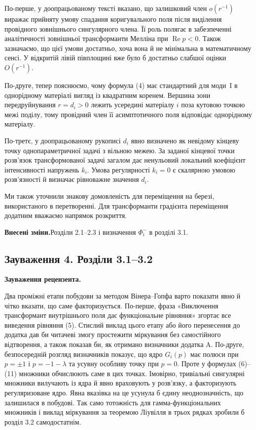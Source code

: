 \documentclass[11pt]{article}
\newcommand{\revisionheading}{\textbf{Внесені зміни.}\enspace}
\newenvironment{reviewcomment}{\def\FrameCommand{\textcolor{blue!45!black}{\vrule width 1.2pt}\hspace{9pt}}\MakeFramed{\advance\hsize-\width\FrameRestore}\noindent\textbf{Зауваження рецензента.}\par\smallskip\noindent}{\endMakeFramed}
\begin{document}
По-перше, у доопрацьованому тексті вказано, що залишковий член \(o(r^{-1})\) виражає прийняту умову спадання коригувального поля після виділення провідного зовнішнього сингулярного члена. Її роль полягає в забезпеченні аналітичності зовнішньої трансформанти Мелліна при \(\operatorname{Re}p<0\). Також зазначаємо, що цієї умови достатньо, хоча вона й не мінімальна в математичному сенсі. У відкритій лівій півплощині вже було б достатньо слабшої оцінки \(O(r^{-1})\).

По-друге, тепер пояснюємо, чому формула (4) має стандартний для моди~I в однорідному матеріалі вигляд із квадратним коренем. Вершина зони передруйнування \(r=d_i>0\) лежить усередині матеріалу \(i\) поза кутовою точкою межі поділу, тому провідний член її асимптотичного поля відповідає однорідному матеріалу.

По-третє, у доопрацьованому рукописі \(d_i\) явно визначено як невідому кінцеву точку однопараметричної задачі з вільною межею. За заданої кінцевої точки розв’язок трансформованої задачі загалом дає ненульовий локальний коефіцієнт інтенсивності напружень \(k_i\). Умова регулярності \(k_i=0\) є скалярною умовою розв’язності й визначає рівноважне значення \(d_i\).

Ми також уточнили знакову домовленість для переміщення на березі, використаного в перетворенні. Для трансформанти градієнта переміщення додатним вважаємо напрямок розкриття.

\revisionheading Розділи 2.1–2.3 і визначення \(\Phi_i^-\) в розділі 3.1.

\subsection*{Зауваження 4. Розділи 3.1–3.2}

\begin{reviewcomment}
Два проміжні етапи побудови за методом Вінера--Гопфа варто показати явно й чітко вказати, що саме факторизується. По-перше, фраза «Виключення трансформант внутрішнього поля дає функціональне рівняння» згортає все виведення рівняння (5). Стислий виклад цього етапу або його перенесення до додатка дав би читачеві змогу простежити міркування без самостійного відтворення, а також показав би, як отримано визначники додатка A. По-друге, безпосередній розгляд визначників показує, що ядро \(G_i(p)\) має полюси при \(p=\pm1\) і \(p=-1-\lambda\) та усувну особливу точку при \(p=0\). Проте у формулах (6)–(11) множники обчислюють саме в цих точках. Імовірно, тривіальні сингулярні множники вилучають із ядра й явно враховують у розв’язку, а факторизують регуляризоване ядро. Явна вказівка на це усунула б єдину неоднозначність, що залишилася в побудові. Так само тотожність для гамма-функціональних множників і виклад міркування за теоремою Ліувілля в трьох рядках зробили б розділ 3.2 самодостатнім.
\end{reviewcomment}
\end{document}
